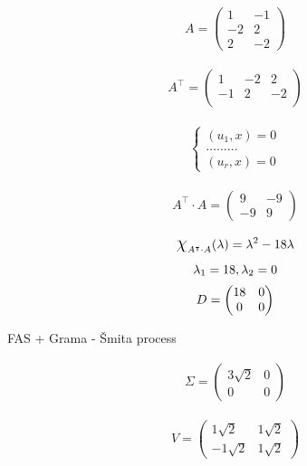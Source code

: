 \documentclass[12pt]{article}
\newcommand*{\bigchi}{\mbox{\Large$\chi$}}%
\begin{document}
\begin{gather*}
	A = 
	\begin{pmatrix}
		1 & -1 \\
		-2 & 2 \\
		2 & -2 
	\end{pmatrix}
\end{gather*} 

\begin{gather*}
	A^\intercal = 
	\begin{pmatrix}
		1 & -2 & 2 \\
		-1 & 2 & -2\\
	\end{pmatrix}
\end{gather*} 
 
 \begin{gather*}
 	\begin{cases}
		(u_1,x) = 0 \\
		\ldots \ldots \ldots \\
		(u_r,x) = 0
	\end{cases}
\end{gather*} 

\begin{gather}
	A^\intercal \cdot A = 
	\begin{pmatrix}
		9 & -9 \\
		-9 & 9
	\end{pmatrix}
\end{gather}

\begin{gather}
	\bigchi_{A^\intercal \cdot A } (\lambda) = \lambda^2 - 18\lambda \\
	\lambda_1 = 18, \lambda_2 = 0 \\
	D = 
	\begin{pmatrix}
		18 & 0 \\
		0 & 0
	\end{pmatrix}
\end{gather}

FAS + Grama - Šmita process

\pagebreak



\begin{gather*}
	\Sigma =
	\begin{pmatrix}
		3\sqrt2 & 0 \\
		0 & 0
	\end{pmatrix}
\end{gather*}

\begin{gather*}
	V =
	\begin{pmatrix}
		1\sqrt2 & 1\sqrt2 \\
		-1\sqrt2 & 1\sqrt2
	\end{pmatrix}
\end{gather*}
\end{document}
